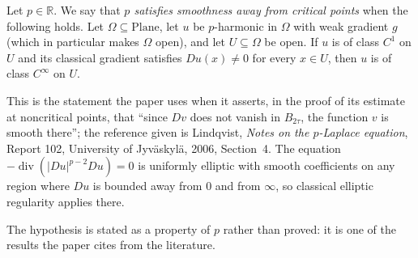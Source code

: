 \begin{definition}
Let $p\in\mathbb{R}$.  We say that \emph{$p$ satisfies smoothness away from critical points}
when the following holds.  Let $\Omega\subseteq\mathrm{Plane}$, let $u$ be $p$-harmonic in
$\Omega$ with weak gradient $g$ (which in particular makes $\Omega$ open), and let
$U\subseteq\Omega$ be open.  If $u$
is of class $C^1$ on $U$ and its classical gradient satisfies $Du(x)\neq0$ for every
$x\in U$, then $u$ is of class $C^\infty$ on $U$.

This is the statement the paper uses when it asserts, in the proof of its estimate at
noncritical points, that ``since $Dv$ does not vanish in $B_{2\tau}$, the function $v$ is
smooth there''; the reference given is Lindqvist, \emph{Notes on the $p$-Laplace equation},
Report 102, University of Jyv\"askyl\"a, 2006, Section~4.  The equation
$-\operatorname{div}(\lvert Du\rvert^{p-2}Du)=0$ is uniformly elliptic with smooth
coefficients on any region where $Du$ is bounded away from $0$ and from $\infty$, so
classical elliptic regularity applies there.

The hypothesis is stated as a property of $p$ rather than proved: it is one of the results
the paper cites from the literature.
\end{definition}

